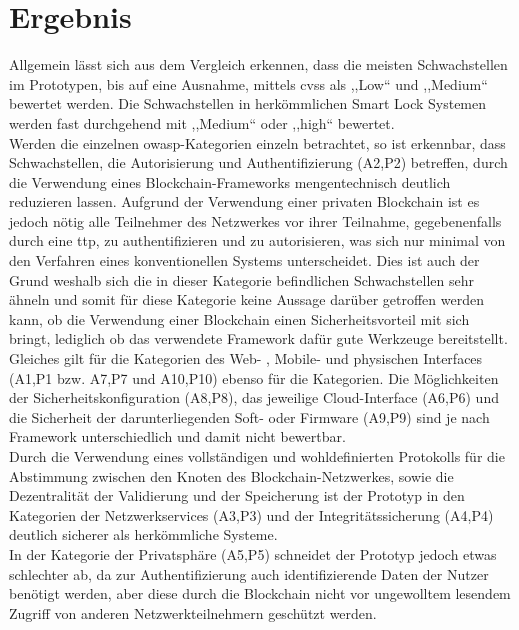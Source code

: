 \section{Ergebnis}
\label{sec:end}
    Allgemein lässt sich aus dem Vergleich erkennen, dass die meisten Schwachstellen im Prototypen, bis auf eine Ausnahme, mittels \gls{cvss} als ,,Low`` und ,,Medium`` bewertet werden. 
    Die Schwachstellen in herkömmlichen Smart Lock Systemen werden fast durchgehend mit ,,Medium`` oder ,,high`` bewertet.
    \medskip\\
    Werden die einzelnen \gls{owasp}-Kategorien einzeln betrachtet, so ist erkennbar, dass Schwachstellen, die Autorisierung und Authentifizierung (A2,P2) betreffen, durch die Verwendung eines Blockchain-Frameworks mengentechnisch deutlich reduzieren lassen. 
    Aufgrund der Verwendung einer privaten Blockchain ist es jedoch nötig alle Teilnehmer des Netzwerkes vor ihrer Teilnahme, gegebenenfalls durch eine \gls{ttp}, zu authentifizieren und zu autorisieren, was sich nur minimal von den Verfahren eines konventionellen Systems unterscheidet.
    Dies ist auch der Grund weshalb sich die in dieser Kategorie befindlichen Schwachstellen sehr ähneln und somit für diese Kategorie keine Aussage darüber getroffen werden kann, ob die Verwendung einer Blockchain einen Sicherheitsvorteil mit sich bringt, lediglich ob das verwendete Framework dafür gute Werkzeuge bereitstellt.
    \medskip\\
    Gleiches gilt für die Kategorien des Web- , Mobile- und physischen Interfaces (A1,P1 bzw. A7,P7 und A10,P10) ebenso für die Kategorien.
    Die Möglichkeiten der Sicherheitskonfiguration (A8,P8), das jeweilige Cloud-Interface (A6,P6) und die Sicherheit der darunterliegenden Soft- oder Firmware (A9,P9) sind je nach Framework unterschiedlich und damit nicht bewertbar.
    \medskip\\
    Durch die Verwendung eines vollständigen und wohldefinierten Protokolls für die Abstimmung zwischen den Knoten des Blockchain-Netzwerkes, sowie die Dezentralität der Validierung und der Speicherung ist der Prototyp in den Kategorien der Netzwerkservices (A3,P3) und der Integritätssicherung (A4,P4) deutlich sicherer als herkömmliche Systeme.
    \medskip\\
    In der Kategorie der Privatsphäre (A5,P5) schneidet der Prototyp jedoch etwas schlechter ab, 
    da zur Authentifizierung auch identifizierende Daten der Nutzer benötigt werden, aber diese durch die Blockchain nicht vor ungewolltem lesendem Zugriff von anderen Netzwerkteilnehmern geschützt werden. 
